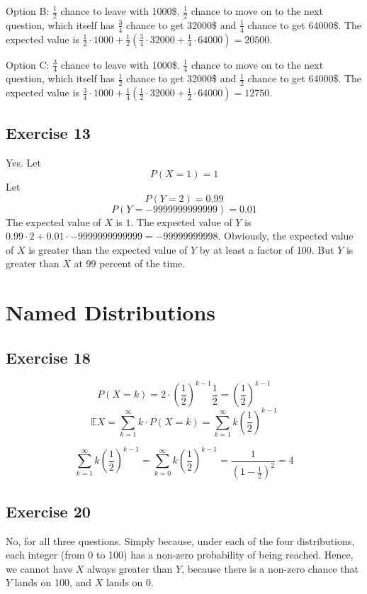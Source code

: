 \documentclass{book}
\begin{document}
\noindent
Option B: $\frac{1}{2}$ chance to leave with 1000\$. $\frac{1}{2}$ chance to move on to the next question, which itself has $\frac{3}{4}$ chance to get 32000\$ and $\frac{1}{4}$ chance to get 64000\$. The expected value is $\frac{1}{2} \cdot 1000 + \frac{1}{2} \left( \frac{3}{4} \cdot 32000 + \frac{1}{4} \cdot 64000 \right) = 20500$.

\noindent
Option C: $\frac{3}{4}$ chance to leave with 1000\$. $\frac{1}{4}$ chance to move on to the next question, which itself has $\frac{1}{2}$ chance to get 32000\$ and $\frac{1}{2}$ chance to get 64000\$. The expected value is $\frac{3}{4} \cdot 1000 + \frac{1}{4} \left( \frac{1}{2} \cdot 32000 + \frac{1}{2} \cdot 64000 \right) = 12750$.

\subsection*{Exercise 13}
Yes. Let
$$P(X = 1) = 1$$
Let
$$P(Y = 2) = 0.99$$
$$P(Y = -9999999999999) = 0.01$$
The expected value of $X$ is $1$. The expected value of $Y$ is $0.99 \cdot 2 + 0.01 \cdot -9999999999999 = -99999999998$. Obviously, the expected value of $X$ is greater than the expected value of $Y$ by at least a factor of 100. But $Y$ is greater than $X$ at 99 percent of the time.

\section{Named Distributions}

\subsection*{Exercise 18}
$$P(X = k) = 2 \cdot \left( \frac{1}{2} \right)^{k - 1} \frac{1}{2} = \left( \frac{1}{2} \right)^{k - 1}$$
$$\mathbb{E} X = \sum_{k = 1}^\infty k \cdot P(X = k) = \sum_{k = 1}^\infty k \left( \frac{1}{2} \right)^{k - 1}$$

$$\sum_{k = 1}^\infty k \left( \frac{1}{2} \right)^{k - 1} = \sum_{k = 0}^\infty k \left( \frac{1}{2} \right)^{k - 1} = \frac{1}{(1 - \frac{1}{2})^2} = 4$$

\subsection*{Exercise 20}
No, for all three questions. Simply because, under each of the four distributions, each integer (from 0 to 100) has a non-zero probability of being reached. Hence, we cannot have $X$ always greater than $Y$, because there is a non-zero chance that $Y$ lands on 100, and $X$ lands on 0.
\end{document}
